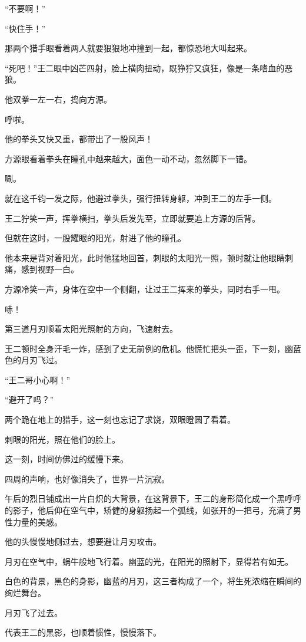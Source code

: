 \begin{this_body}
“不要啊！”

“快住手！”

那两个猎手眼看着两人就要狠狠地冲撞到一起，都惊恐地大叫起来。

“死吧！”王二眼中凶芒四射，脸上横肉扭动，既狰狞又疯狂，像是一条嗜血的恶狼。

他双拳一左一右，捣向方源。

呼啦。

他的拳头又快又重，都带出了一股风声！

方源眼看着拳头在瞳孔中越来越大，面色一动不动，忽然脚下一错。

唰。

就在这千钧一发之际，他避过拳头，强行扭转身躯，冲到王二的左手一侧。

王二狞笑一声，挥拳横扫，拳头后发先至，立即就要追上方源的后背。

但就在这时，一股耀眼的阳光，射进了他的瞳孔。

他本来是背对着阳光，此时他猛地回首，刺眼的太阳光一照，顿时就让他眼睛刺痛，感到视野一白。

方源冷笑一声，身体在空中一个侧翻，让过王二挥来的拳头，同时右手一甩。

哧！

第三道月刃顺着太阳光照射的方向，飞速射去。

王二顿时全身汗毛一炸，感到了史无前例的危机。他慌忙把头一歪，下一刻，幽蓝色的月刃飞过。

“王二哥小心啊！”

“避开了吗？”

两个跪在地上的猎手，这一刻也忘记了求饶，双眼瞪圆了看着。

刺眼的阳光，照在他们的脸上。

这一刻，时间仿佛过的缓慢下来。

四周的声响，也好像消失了，世界一片沉寂。

午后的烈日铺成出一片白炽的大背景，在这背景下，王二的身形简化成一个黑呼呼的影子，他后仰在空气中，矫健的身躯扬起一个弧线，如张开的一把弓，充满了男性力量的美感。

他的头慢慢地侧过去，想要避让月刃攻击。

月刃在空气中，蜗牛般地飞行着。幽蓝的光，在阳光的照射下，显得若有如无。

白色的背景，黑色的身影，幽蓝的月刃，这三者构成了一个，将生死浓缩在瞬间的绚烂舞台。

月刃飞了过去。

代表王二的黑影，也顺着惯性，慢慢落下。


\end{this_body}
